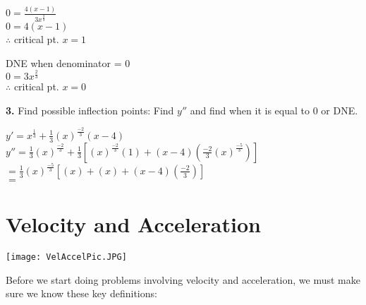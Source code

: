 \documentclass[12pt,fleqn]{book} %
\begin{document}
\begin{multicols}{2}
    \begin{center}
        $0= \frac{4(x-1)}{3x^\frac{2}{3}}$ \\
        \vspace*{1mm}
        $0 = 4(x-1)$ \\
        \vspace*{1mm}
        $\therefore$ critical pt. $x = 1$
        \columnbreak

        DNE when denominator = 0 \\
        \vspace*{1mm}
        $0 = 3x^\frac{2}{3}$ \\
        \vspace*{1mm}
        $\therefore$ critical pt. $x = 0$
    \end{center}
\end{multicols}

\noindent \textbf{3.} Find possible inflection points: Find $y''$ and find when it is equal to 0 or DNE.

\vspace*{-6mm}

\begin{center}
    $y' = x^\frac{1}{3} + \frac{1}{3}(x)^\frac{-2}{3}(x-4)$ \\
    \vspace*{2mm}
    $y'' = \frac{1}{3}(x)^\frac{-2}{3} + \frac{1}{3}[(x)^\frac{-2}{3}(1)+(x-4)(\frac{-2}{3}(x)^\frac{-5}{3})]$ \\
    \vspace*{1mm}
    $= \frac{1}{3}(x)^\frac{-5}{3}[(x) + (x) + (x-4)(\frac{-2}{3})]$ \\
    \vspace*{1mm}
    $=$
\end{center}


\section{Velocity and Acceleration}

\texttt{[image: VelAccelPic.JPG]}

\noindent Before we start doing problems involving velocity and acceleration, we must make sure we know these key definitions:

\vspace*{2mm}
\end{document}

